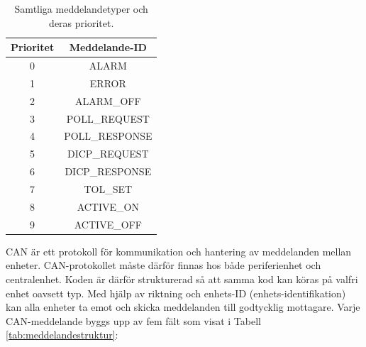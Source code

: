 \documentclass[a4paper]{article}
\begin{document}

\begin{table}[H]
    \centering
    \caption{Samtliga meddelandetyper och deras prioritet.}
    \label{tab:meddelandetyper}
    \begin{tabular}{|c||c|}\hline
        Prioritet & Meddelande-ID \\\hline\hline
        0 & ALARM \\\hline
        1 & ERROR \\\hline
        2 & ALARM\_OFF \\\hline
        3 & POLL\_REQUEST \\\hline
        4 & POLL\_RESPONSE \\\hline
        5 & DICP\_REQUEST \\\hline
        6 & DICP\_RESPONSE \\\hline
        7 & TOL\_SET \\\hline
        8 & ACTIVE\_ON \\\hline
        9 & ACTIVE\_OFF \\\hline
    \end{tabular}
\end{table}


\noindent CAN är ett protokoll för kommunikation och hantering av meddelanden mellan enheter.
CAN-protokollet måste därför finnas hos både periferienhet och centralenhet.
Koden är därför strukturerad så att samma kod kan köras på valfri enhet oavsett typ.
Med hjälp av riktning och enhets-ID (enhets-identifikation) kan alla enheter ta emot och skicka meddelanden till godtycklig mottagare.
Varje CAN-meddelande byggs upp av fem fält som visat i Tabell \ref{tab:meddelandestruktur}:
\end{document}

